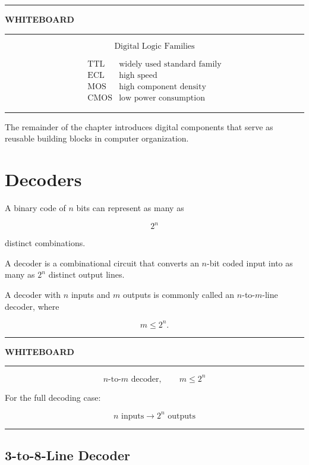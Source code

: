 \documentclass[11pt]{article}
\newenvironment{whiteboard}
{
    \par\medskip
    \hrule
    \vspace{0.35em}
    \noindent\textbf{\large WHITEBOARD}
    \par\vspace{0.3em}
    \hrule
    \vspace{0.65em}
}
{
    \vspace{0.45em}
    \hrule
    \par\medskip
}
\begin{document}
\begin{whiteboard}

\[
\boxed{\text{Digital Logic Families}}
\]

\[
\begin{array}{c|l}
\text{TTL}
&
\text{widely used standard family}
\\
\text{ECL}
&
\text{high speed}
\\
\text{MOS}
&
\text{high component density}
\\
\text{CMOS}
&
\text{low power consumption}
\end{array}
\]

\end{whiteboard}

The remainder of the chapter introduces digital components that serve as
reusable building blocks in computer organization.

\section{Decoders}

A binary code of \(n\) bits can represent as many as

\[
2^n
\]

distinct combinations.

A decoder is a combinational circuit that converts an \(n\)-bit coded input
into as many as \(2^n\) distinct output lines.

A decoder with \(n\) inputs and \(m\) outputs is commonly called an
\(n\)-to-\(m\)-line decoder, where

\[
m\leq 2^n.
\]

\begin{whiteboard}

\[
\boxed{
n\text{-to-}m\text{ decoder},
\qquad
m\leq2^n
}
\]

For the full decoding case:

\[
\boxed{
n\text{ inputs}
\rightarrow
2^n\text{ outputs}
}
\]

\end{whiteboard}

\subsection{3-to-8-Line Decoder}
\end{document}

